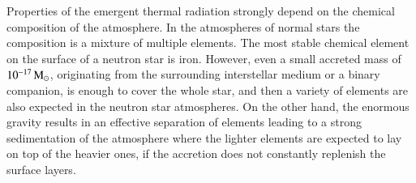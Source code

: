 
Properties of the emergent thermal radiation strongly depend on the chemical composition of the atmosphere.
In the atmospheres of normal stars the composition is a mixture of multiple elements.
The most stable chemical element on the surface of a neutron star is iron.
However, even a small accreted mass of $10^{-17}\, \mathrm{M}_{\odot}$, originating from the surrounding interstellar medium or a binary companion, is enough to cover the whole star, and then a variety of elements are also expected in the neutron star atmospheres.
On the other hand, the enormous gravity results in an effective separation of elements leading to a strong sedimentation of the atmosphere where the lighter elements are expected to lay on top of the heavier ones, if the accretion does not constantly replenish the surface layers.\cite{AI80}



